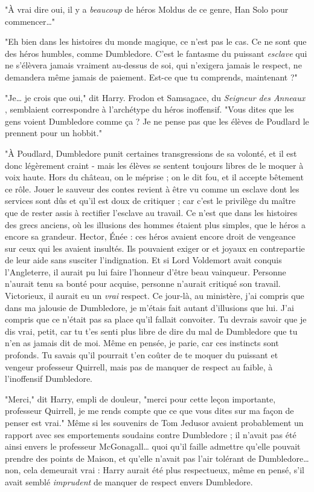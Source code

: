 "À vrai dire oui, il y a \emph{beaucoup}  de héros Moldus de ce genre, Han Solo pour commencer…"

"Eh bien dans les histoires du monde magique, ce n'est pas le cas. Ce ne sont que des héros humbles, comme Dumbledore. C'est le fantasme du puissant \emph{esclave}  qui ne s'élèvera jamais vraiment au-dessus de soi, qui n'exigera jamais le respect, ne demandera même jamais de paiement. Est-ce que tu comprends, maintenant ?"

"Je… je crois que oui," dit Harry. Frodon et Samsagace, du \emph{Seigneur des Anneaux} , semblaient correspondre à l'archétype du héros inoffensif. "Vous dites que les gens voient Dumbledore comme ça ? Je ne pense pas que les élèves de Poudlard le prennent pour un hobbit."

"À Poudlard, Dumbledore punit certaines transgressions de sa volonté, et il est donc légèrement craint - mais les élèves se sentent toujours libres de le moquer à voix haute. Hors du château, on le méprise ; on le dit fou, et il accepte bêtement ce rôle. Jouer le sauveur des contes revient à être vu comme un esclave dont les services sont dûs et qu'il est doux de critiquer ; car c'est le privilège du maître que de rester assis à rectifier l'esclave au travail. Ce n'est que dans les histoires des grecs anciens, où les illusions des hommes étaient plus simples, que le héros a encore sa grandeur. Hector, Énée : ces héros avaient encore droit de vengeance sur ceux qui les avaient insultés. Ils pouvaient exiger or et joyaux en contrepartie de leur aide sans susciter l'indignation. Et si Lord Voldemort avait conquis l'Angleterre, il aurait pu lui faire l'honneur d'être beau vainqueur. Personne n'aurait tenu sa bonté pour acquise, personne n'aurait critiqué son travail. Victorieux, il aurait eu un \emph{vrai}  respect. Ce jour-là, au ministère, j'ai compris que dans ma jalousie de Dumbledore, je m'étais fait autant d'illusions que lui. J'ai compris que ce n'était pas sa place qu'il fallait convoiter. Tu devrais savoir que je dis vrai, petit, car tu t'es senti plus libre de dire du mal de Dumbledore que tu n'en as jamais dit de moi. Même en pensée, je parie, car ces instincts sont profonds. Tu savais qu'il pourrait t'en coûter de te moquer du puissant et vengeur professeur Quirrell, mais pas de manquer de respect au faible, à l'inoffensif Dumbledore.

"Merci," dit Harry, empli de douleur, "merci pour cette leçon importante, professeur Quirrell, je me rends compte que ce que vous dites sur ma façon de penser est vrai." Même si les souvenirs de Tom Jedusor avaient probablement un rapport avec ses emportements soudains contre Dumbledore ; il n'avait pas été ainsi envers le professeur McGonagall… quoi qu'il faille admettre qu'elle pouvait prendre des points de Maison, et qu'elle n'avait pas l'air tolérant de Dumbledore… non, cela demeurait vrai : Harry aurait été plus respectueux, même en pensé, s'il avait semblé \emph{imprudent}  de manquer de respect envers Dumbledore.

